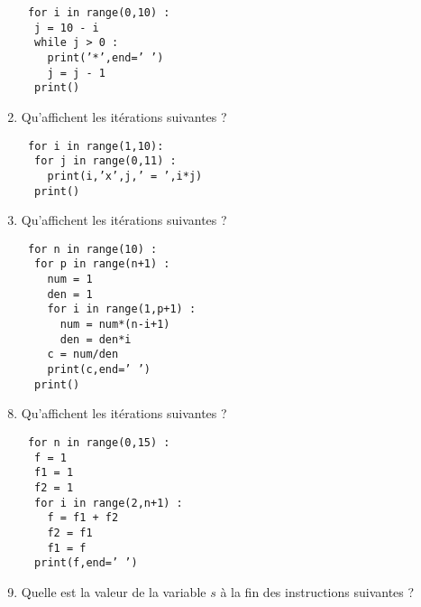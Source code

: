 \begin{td}
\begin{minipage}[t]{7cm}
\begin{enumerate}
	{\footnotesize\tt
	for i in range(0,10) :\\
	\mbox{}\ \ j = 10 - i\\
	\mbox{}\ \ while j > 0 :\\
	\mbox{}\ \ \ \ print('*',end=' ')\\
	\mbox{}\ \ \ \ j = j - 1\\
	\mbox{}\ \ print()
	}
\item Qu'affichent les itérations suivantes ?

	{\footnotesize\tt
	for i in range(1,10):\\
	\mbox{}\ \ for j in range(0,11) :\\
	\mbox{}\ \ \ \ print(i,'x',j,' = ',i*j)\\
	\mbox{}\ \ print()
	}
\item Qu'affichent les itérations suivantes ?

	{\footnotesize\tt
	for n in range(10) :\\
  	\mbox{}\ \ for p in range(n+1) :\\
    	\mbox{}\ \ \ \ num = 1\\
    	\mbox{}\ \ \ \ den = 1\\
    	\mbox{}\ \ \ \ for i in range(1,p+1) :\\
      	\mbox{}\ \ \ \ \ \ num = num*(n-i+1)\\
      	\mbox{}\ \ \ \ \ \ den = den*i\\
    	\mbox{}\ \ \ \ c = num/den\\
    	\mbox{}\ \ \ \ print(c,end=' ')\\
  	\mbox{}\ \ print()
	}
\end{enumerate}
\end{minipage}
\hfill
\begin{minipage}[t]{7cm}
\begin{enumerate}\setcounter{enumi}{7}
\item Qu'affichent les itérations suivantes ?

	{\footnotesize\tt
	for n in range(0,15) :\\
  	\mbox{}\ \ f = 1\\
  	\mbox{}\ \ f1 = 1\\
  	\mbox{}\ \ f2 = 1\\
  	\mbox{}\ \ for i in range(2,n+1) :\\
    	\mbox{}\ \ \ \ f = f1 + f2\\
    	\mbox{}\ \ \ \ f2 = f1\\
    	\mbox{}\ \ \ \ f1 = f\\
  	\mbox{}\ \ print(f,end=' ')
	}
\item Quelle est la valeur de la variable $s$
	à la fin des instructions suivantes ?


\end{enumerate}
\end{minipage}
\end{td}
